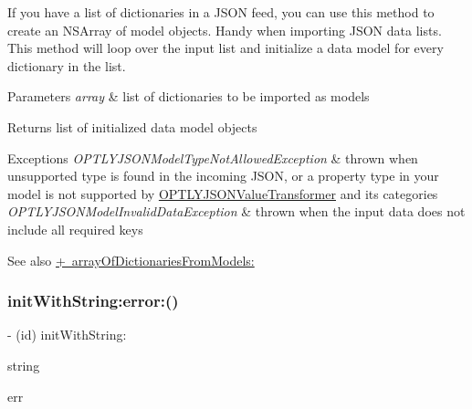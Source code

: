 If you have a list of dictionaries in a J\+S\+ON feed, you can use this method to create an N\+S\+Array of model objects. Handy when importing J\+S\+ON data lists. This method will loop over the input list and initialize a data model for every dictionary in the list.


\begin{DoxyParams}{Parameters}
{\em array} & list of dictionaries to be imported as models \\
\hline
\end{DoxyParams}
\begin{DoxyReturn}{Returns}
list of initialized data model objects 
\end{DoxyReturn}

\begin{DoxyExceptions}{Exceptions}
{\em O\+P\+T\+L\+Y\+J\+S\+O\+N\+Model\+Type\+Not\+Allowed\+Exception} & thrown when unsupported type is found in the incoming J\+S\+ON, or a property type in your model is not supported by \mbox{\hyperlink{interface_o_p_t_l_y_j_s_o_n_value_transformer}{O\+P\+T\+L\+Y\+J\+S\+O\+N\+Value\+Transformer}} and its categories \\
\hline
{\em O\+P\+T\+L\+Y\+J\+S\+O\+N\+Model\+Invalid\+Data\+Exception} & thrown when the input data does not include all required keys \\
\hline
\end{DoxyExceptions}
\begin{DoxySeeAlso}{See also}
\mbox{\hyperlink{interface_o_p_t_l_y_j_s_o_n_model_a6094627ef7b6ea29638aa744cf529090}{+ array\+Of\+Dictionaries\+From\+Models\+:}} 
\end{DoxySeeAlso}
\mbox{\label{interface_o_p_t_l_y_j_s_o_n_model_a1f1a61cd0197acd5306284ca658cbbf5}} 
\subsubsection{\texorpdfstring{init\+With\+String\+:error\+:()}{initWithString:error:()}}
{\footnotesize\ttfamily -\/ (id) init\+With\+String\+: \begin{DoxyParamCaption}\item[{(N\+S\+String $\ast$)}]{string }\item[{error:(\mbox{\hyperlink{interface_o_p_t_l_y_j_s_o_n_model_error}{O\+P\+T\+L\+Y\+J\+S\+O\+N\+Model\+Error}} $\ast$$\ast$)}]{err }\end{DoxyParamCaption}}

